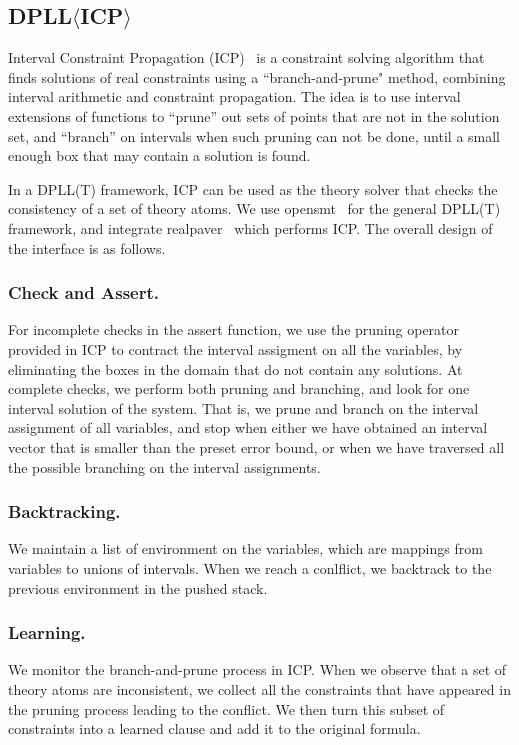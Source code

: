 \documentclass[envcountsect]{llncs}
\begin{document}
\subsection{DPLL$\langle$ICP$\rangle$}

Interval Constraint Propagation (ICP)~\cite{handbookICP} is a constraint solving
algorithm that finds
solutions of real constraints using a ``branch-and-prune" method, combining
interval arithmetic and constraint propagation. The idea is to use interval
extensions of functions to ``prune'' out sets of points that are not in the
solution set, and ``branch'' on intervals when such pruning can not be done,
until a small enough box that may contain a solution is found. 

In a DPLL(T) framework, ICP can be used as the theory solver that checks the
consistency of a set of theory atoms. We use {\sf opensmt}~\cite{} for the
general
DPLL(T) framework, and integrate {\sf realpaver}~\cite{} which performs ICP. The
overall design of the interface is as follows. 
\subsubsection{Check and Assert.} For incomplete checks in the assert function,
we use the pruning operator provided in ICP to contract the interval assigment
on all the variables, by eliminating the boxes in the domain that do not contain
any solutions. At complete checks, we perform both pruning and branching, and
look for one interval solution of the system. That is, we prune and branch on
the interval assignment of all variables, and stop when either we have obtained
an interval vector that is smaller than the preset error bound, or when we have
traversed all the possible branching on the interval assignments. 
\subsubsection{Backtracking.} We maintain a list of environment on the variables,
which are mappings from variables to unions of intervals. When we reach a
conlflict, we backtrack to the previous environment in the pushed stack. 
\subsubsection{Learning.} We monitor the branch-and-prune process in ICP.
When we observe that a set of theory atoms are inconsistent, we collect all the
constraints that have appeared in the pruning process leading to the conflict.
We then turn this subset of constraints into a learned clause and add it to the
original formula. 
\end{document}

